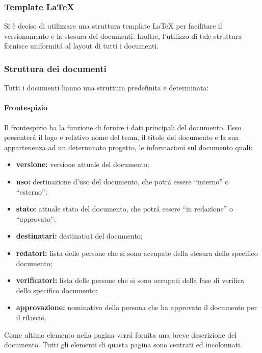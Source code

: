 		\subsubsection{Template LaTeX}
			Si è deciso di utilizzare una struttura template \LaTeX{} per facilitare il versionamento e la stesura dei documenti. Inoltre, l'utilizzo di tale struttura fornisce uniformitá al layout di tutti i documenti.

		\subsubsection{Struttura dei documenti}
			Tutti i documenti hanno una struttura predefinita e determinata:
			\paragraph{Frontespizio}
				Il frontespizio ha la funzione di fornire i dati principali del documento. Esso presenterá il logo e relativo nome del team, il titolo del documento e la sua appartenenza ad un determinato progetto, le informazioni sul documento quali:
				\begin{itemize}
					\item \textbf{versione:} versione attuale del documento;
					\item \textbf{uso:} destinazione d'uso del documento, che potrá essere ``interno'' o ``esterno'';
					\item \textbf{stato:} attuale stato del documento, che potrá essere ``in redazione'' o ``approvato'';
					\item \textbf{destinatari:} destinatari del documento;
					\item \textbf{redatori:} lista delle persone che si sono accupate della stesura dello specifico documento;
					\item \textbf{verificatori:} lista delle persone che si sono occupati della fase di verifica dello specifico documento;
					\item \textbf{approvazione:} nominativo della persona che ha approvato il documento per il rilascio.
				\end{itemize}
				Come ultimo elemento nella pagina verrá fornita una breve descrizione del documento. Tutti gli elementi di quasta pagina sono centrati ed incolonnati.
